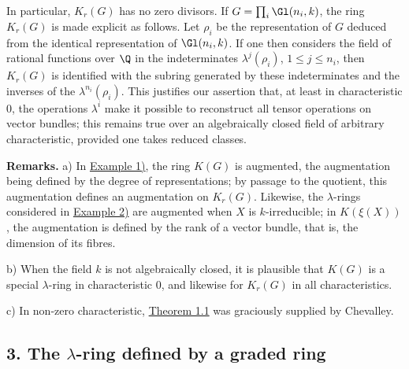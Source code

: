 In particular, $K_r(G)$ has no zero divisors. If $G=\prod_i\Gl(n_i,k)$, the ring $K_r(G)$ is made explicit as follows. Let $\rho_i$ be the representation of $G$ deduced from the identical representation of $\Gl(n_i,k)$. If one then considers the field of rational functions over $\Q$ in the indeterminates $\lambda^j(\rho_i)$, $1\leq j\leq n_i$, then $K_r(G)$ is identified with the subring generated by these indeterminates and the inverses of the $\lambda^{n_i}(\rho_i)$. This justifies our assertion that, at least in characteristic $0$, the operations $\lambda^i$ make it possible to reconstruct all tensor operations on vector bundles; this remains true over an algebraically closed field of arbitrary characteristic, provided one takes reduced classes.

\textbf{Remarks.} a) In \hyperlink{sga6.e00.ex.2-1}{Example 1)}, the ring $K(G)$ is augmented, the augmentation being defined by the degree of representations; by passage to the quotient, this augmentation defines an augmentation on $K_r(G)$. Likewise, the $\lambda$-rings considered in \hyperlink{sga6.e00.ex.2-2}{Example 2)} are augmented when $X$ is $k$-irreducible; in $K(\xi(X))$, the augmentation is defined by the rank of a vector bundle, that is, the dimension of its fibres.

b) When the field $k$ is not algebraically closed, it is plausible that $K(G)$ is a special $\lambda$-ring in characteristic $0$, and likewise for $K_r(G)$ in all characteristics.

c) In non-zero characteristic, \hyperlink{sga6.e00.thm.1-1}{Theorem 1.1} was graciously supplied by Chevalley.

\subsection*{3. The $\lambda$-ring defined by a graded ring}

